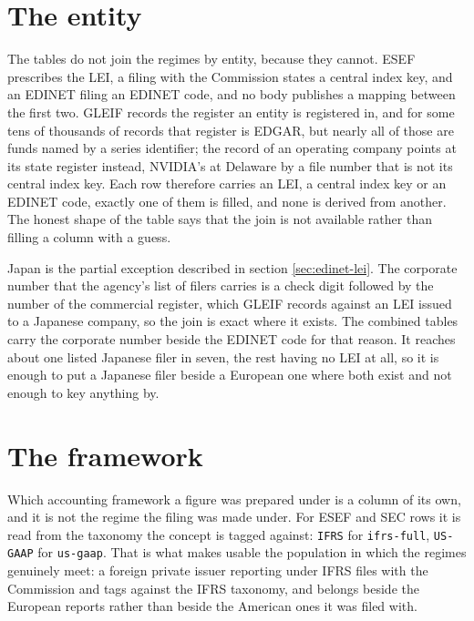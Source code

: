 \section{The entity}

The tables do not join the regimes by entity, because they cannot. ESEF prescribes the LEI, a filing with the Commission states a central index key, and an EDINET filing an EDINET code, and no body publishes a mapping between the first two. GLEIF records the register an entity is registered in, and for some tens of thousands of records that register is EDGAR, but nearly all of those are funds named by a series identifier; the record of an operating company points at its state register instead, NVIDIA's at Delaware by a file number that is not its central index key. Each row therefore carries an LEI, a central index key or an EDINET code, exactly one of them is filled, and none is derived from another. The honest shape of the table says that the join is not available rather than filling a column with a guess.

Japan is the partial exception described in section \ref{sec:edinet-lei}. The corporate number that the agency's list of filers carries is a check digit followed by the number of the commercial register, which GLEIF records against an LEI issued to a Japanese company, so the join is exact where it exists. The combined tables carry the corporate number beside the EDINET code for that reason. It reaches about one listed Japanese filer in seven, the rest having no LEI at all, so it is enough to put a Japanese filer beside a European one where both exist and not enough to key anything by.

\section{The framework}

Which accounting framework a figure was prepared under is a column of its own, and it is not the regime the filing was made under. For ESEF and SEC rows it is read from the taxonomy the concept is tagged against: \verb|IFRS| for \verb|ifrs-full|, \verb|US-GAAP| for \verb|us-gaap|. That is what makes usable the population in which the regimes genuinely meet: a foreign private issuer reporting under IFRS files with the Commission and tags against the IFRS taxonomy, and belongs beside the European reports rather than beside the American ones it was filed with.

